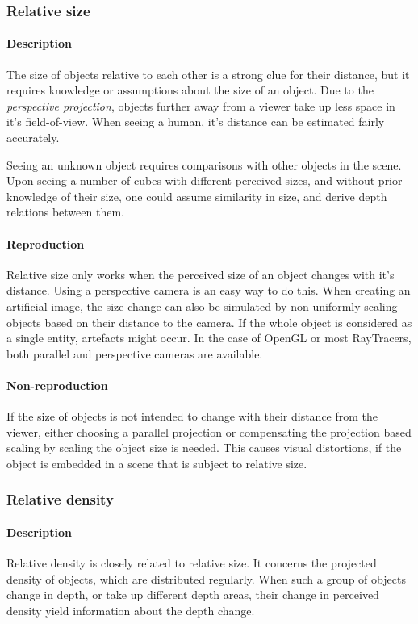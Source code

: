 \subsubsection{Relative size}
\paragraph{Description}
The size of objects relative to each other is a strong clue for their distance, but it requires knowledge or assumptions about the size of an object. Due to the \textit{perspective projection}, objects further away from a viewer take up less space in it's field-of-view. When seeing a human, it's distance can be estimated fairly accurately.

Seeing an unknown object requires comparisons with other objects in the scene. Upon seeing a number of cubes with different perceived sizes, and without prior knowledge of their size, one could assume similarity in size, and derive depth relations between them.

\paragraph{Reproduction}
Relative size only works when the perceived size of an object changes with it's distance. Using a perspective camera is an easy way to do this. When creating an artificial image, the size change can also be simulated by non-uniformly scaling objects based on their distance to the camera. If the whole object is considered as a single entity, artefacts might occur. In the case of OpenGL or most RayTracers, both parallel and perspective cameras are available.

\paragraph{Non-reproduction}
If the size of objects is not intended to change with their distance from the viewer, either choosing a parallel projection or compensating the projection based scaling by scaling the object size is needed. This causes visual distortions, if the object is embedded in a scene that is subject to relative size.


\subsubsection{Relative density}
\paragraph{Description}
Relative density is closely related to relative size. It concerns the projected density of objects, which are distributed regularly. When such a group of objects change in depth, or take up different depth areas, their change in perceived density yield information about the depth change.

